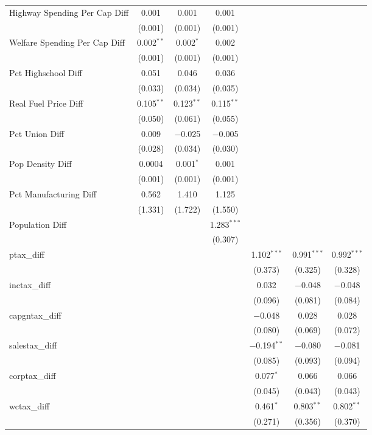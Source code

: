 \begin{table}[!htbp]
\begin{tabular}{@{\extracolsep{5pt}}lcccccc}
  Highway Spending Per Cap Diff & 0.001 & 0.001 & 0.001 &  &  &  \\ 
  & (0.001) & (0.001) & (0.001) &  &  &  \\ 
  Welfare Spending Per Cap Diff & 0.002$^{**}$ & 0.002$^{*}$ & 0.002 &  &  &  \\ 
  & (0.001) & (0.001) & (0.001) &  &  &  \\ 
  Pct Highschool Diff & 0.051 & 0.046 & 0.036 &  &  &  \\ 
  & (0.033) & (0.034) & (0.035) &  &  &  \\ 
  Real Fuel Price Diff & 0.105$^{**}$ & 0.123$^{**}$ & 0.115$^{**}$ &  &  &  \\ 
  & (0.050) & (0.061) & (0.055) &  &  &  \\ 
  Pct Union Diff & 0.009 & $-$0.025 & $-$0.005 &  &  &  \\ 
  & (0.028) & (0.034) & (0.030) &  &  &  \\ 
  Pop Density Diff & 0.0004 & 0.001$^{*}$ & 0.001 &  &  &  \\ 
  & (0.001) & (0.001) & (0.001) &  &  &  \\ 
  Pct Manufacturing Diff & 0.562 & 1.410 & 1.125 &  &  &  \\ 
  & (1.331) & (1.722) & (1.550) &  &  &  \\ 
  Population Diff &  &  & 1.283$^{***}$ &  &  &  \\ 
  &  &  & (0.307) &  &  &  \\ 
  ptax\_diff &  &  &  & 1.102$^{***}$ & 0.991$^{***}$ & 0.992$^{***}$ \\ 
  &  &  &  & (0.373) & (0.325) & (0.328) \\ 
  inctax\_diff &  &  &  & 0.032 & $-$0.048 & $-$0.048 \\ 
  &  &  &  & (0.096) & (0.081) & (0.084) \\ 
  capgntax\_diff &  &  &  & $-$0.048 & 0.028 & 0.028 \\ 
  &  &  &  & (0.080) & (0.069) & (0.072) \\ 
  salestax\_diff &  &  &  & $-$0.194$^{**}$ & $-$0.080 & $-$0.081 \\ 
  &  &  &  & (0.085) & (0.093) & (0.094) \\ 
  corptax\_diff &  &  &  & 0.077$^{*}$ & 0.066 & 0.066 \\ 
  &  &  &  & (0.045) & (0.043) & (0.043) \\ 
  wctax\_diff &  &  &  & 0.461$^{*}$ & 0.803$^{**}$ & 0.802$^{**}$ \\ 
  &  &  &  & (0.271) & (0.356) & (0.370) \\ 

\end{tabular}
\end{table}
